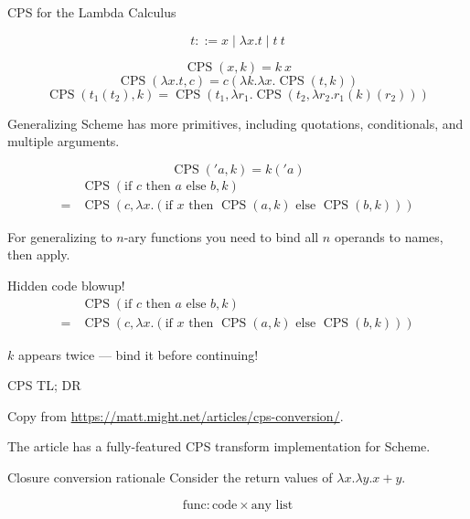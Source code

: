 \documentclass{beamer}
\begin{document}
\newcommand{\CPS}{\operatorname{CPS}}

\begin{frame}{CPS for the Lambda Calculus}
  \begin{definition}
    \[t ::= x \mid \lambda x.t \mid t\ t\]
  \end{definition}
  
  \begin{theorem}
    \[\CPS(x, k)=k\ x\]
    \[\CPS(\lambda x.t, c)=c(\lambda k.\lambda x. \CPS(t, k))\]
    \[\CPS(t_1(t_2), k)=\CPS(t_1,\lambda r_1.\CPS(t_2,\lambda r_2.r_1(k)(r_2)))\]
  \end{theorem}
\end{frame}

\begin{frame}{Generalizing}
  Scheme has more primitives, including quotations, conditionals, and multiple arguments.

  \[\CPS('a,k)=k('a)\]
  \[\begin{aligned}
    &\CPS(\text{if }c\text{ then }a\text{ else }b, k)\\
    =&\CPS(c, \lambda x.(\text{if }x\text{ then }\CPS(a,k)\text{ else }\CPS(b,k)))
  \end{aligned}\]

For generalizing to $n$-ary functions you need to bind all $n$ operands to names, then apply.
\end{frame}

\begin{frame}[fragile]{Hidden code blowup!}
  \[\begin{aligned}
    &\CPS(\text{if }c\text{ then }a\text{ else }b, k)\\
    =&\CPS(c, \lambda x.(\text{if }x\text{ then }\CPS(a,k)\text{ else }\CPS(b,k)))
  \end{aligned}\]

$k$ appears twice --- bind it before continuing!
\end{frame}

\begin{frame}{CPS TL; DR}
  \begin{center}
    Copy from \url{https://matt.might.net/articles/cps-conversion/}.
  \end{center}
  The article has a fully-featured CPS transform implementation for Scheme.
\end{frame}

\begin{frame}{Closure conversion rationale}
  Consider the return values of $\lambda x.\lambda y.x+y$.

  \[\text{func}: \text{code}\times\text{any list}\]
\end{frame}
\end{document}
